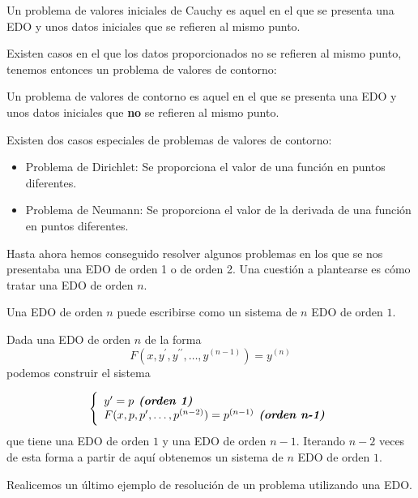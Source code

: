 \begin{definition}
Un problema de valores iniciales de Cauchy es aquel en el que se presenta una EDO y unos datos iniciales que se refieren al mismo punto.
\end{definition}

Existen casos en el que los datos proporcionados no se refieren al mismo punto, tenemos entonces un problema de valores de contorno: 

\begin{definition}
Un problema de valores de contorno es aquel en el que se presenta una EDO y unos datos iniciales que \textbf{no} se refieren al mismo punto.
\end{definition}

Existen dos casos especiales de problemas de valores de contorno:
\begin{itemize}
\item Problema de Dirichlet: Se proporciona el valor de una función en puntos diferentes.
\item Problema de Neumann: Se proporciona el valor de la derivada de una función en puntos diferentes.
\end{itemize}

Hasta ahora hemos conseguido resolver algunos problemas en los que se nos presentaba una EDO de orden 1 o de orden 2. Una cuestión a plantearse es cómo tratar una EDO de orden $n$.

\obs
Una EDO de orden $n$ puede escribirse como un sistema de $n$ EDO de orden $1$.

Dada una EDO de orden $n$ de la forma $$F(x,y^\prime,y^{\prime\prime},\hdots, y^{(n-1)}) = y^{(n)}$$ podemos construir el sistema

\begin{equation*}
  \left\lbrace
  \begin{array}{l}
     y^\prime=p \textit{\textbf{ (orden 1)}}\\
     F(x,p,p^\prime,\hdots, p^{(n-2)}) = p^{(n-1)} \textit{\textbf{ (orden n-1)}}\\
  \end{array}
  \right.
\end{equation*}
que tiene una EDO de orden $1$ y una EDO de orden $n-1$. Iterando $n-2$ veces de esta forma a partir de aquí obtenemos un sistema de $n$ EDO de orden $1$.


Realicemos un último ejemplo de resolución de un problema utilizando una EDO.


